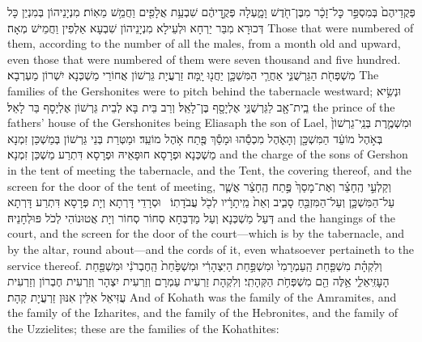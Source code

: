 {פְּקֻדֵיהֶם֙ בְּמִסְפַּ֣ר כׇּל־זָכָ֔ר מִבֶּן־חֹ֖דֶשׁ וָמָ֑עְלָה פְּקֻ֣דֵיהֶ֔ם שִׁבְעַ֥ת אֲלָפִ֖ים וַחֲמֵ֥שׁ מֵאֽוֹת׃}
{מִנְיָנֵיהוֹן בְּמִנְיַן כָּל דְּכוּרָא מִבַּר יַרְחָא וּלְעֵילָא מִנְיָנֵיהוֹן שִׁבְעָא אַלְפִין וַחֲמֵישׁ מְאָה׃}
{Those that were numbered of them, according to the number of all the males, from a month old and upward, even those that were numbered of them were seven thousand and five hundred.}{}
{מִשְׁפְּחֹ֖ת הַגֵּרְשֻׁנִּ֑י אַחֲרֵ֧י הַמִּשְׁכָּ֛ן יַחֲנ֖וּ יָֽמָּה׃}
{זַרְעֲיָת גֵּרְשׁוֹן אֲחוֹרֵי מַשְׁכְּנָא יִשְׁרוֹן מַעְרְבָא׃}
{The families of the Gershonites were to pitch behind the tabernacle westward;}{}
{וּנְשִׂ֥יא בֵֽית־אָ֖ב לַגֵּרְשֻׁנִּ֑י אֶלְיָסָ֖ף בֶּן־לָאֵֽל׃}
{וְרַב בֵּית בָּא לְבֵית גֵּרְשׁוֹן אֶלְיָסָף בַּר לָאֵל׃}
{the prince of the fathers’ house of the Gershonites being Eliasaph the son of Lael,}{}
{וּמִשְׁמֶ֤רֶת בְּנֵֽי־גֵרְשׁוֹן֙ בְּאֹ֣הֶל מוֹעֵ֔ד הַמִּשְׁכָּ֖ן וְהָאֹ֑הֶל מִכְסֵ֕הוּ וּמָסַ֕ךְ פֶּ֖תַח אֹ֥הֶל מוֹעֵֽד׃
}
{וּמַטְּרַת בְּנֵי גֵּרְשׁוֹן בְּמַשְׁכַּן זִמְנָא מַשְׁכְּנָא וּפְרָסָא חוּפָאֵיהּ וּפְרָסָא דִּתְרַע מַשְׁכַּן זִמְנָא׃}
{and the charge of the sons of Gershon in the tent of meeting the tabernacle, and the Tent, the covering thereof, and the screen for the door of the tent of meeting,}{}
{וְקַלְעֵ֣י הֶֽחָצֵ֗ר וְאֶת־מָסַךְ֙ פֶּ֣תַח הֶֽחָצֵ֔ר אֲשֶׁ֧ר עַל־הַמִּשְׁכָּ֛ן וְעַל־הַמִּזְבֵּ֖חַ סָבִ֑יב וְאֵת֙ מֵֽיתָרָ֔יו לְכֹ֖ל עֲבֹדָתֽוֹ׃ \setuma 
{}}
{וּסְרָדֵי דָּרְתָא וְיָת פְּרָסָא דִּתְרַע דָּרְתָא דְּעַל מַשְׁכְּנָא וְעַל מַדְבְּחָא סְחוֹר סְחוֹר וְיָת אֲטוּנוֹהִי לְכֹל פּוּלְחָנֵיהּ׃}
{and the hangings of the court, and the screen for the door of the court—which is by the tabernacle, and by the altar, round about—and the cords of it, even whatsoever pertaineth to the service thereof.}{}
{וְלִקְהָ֗ת מִשְׁפַּ֤חַת הַֽעַמְרָמִי֙ וּמִשְׁפַּ֣חַת הַיִּצְהָרִ֔י וּמִשְׁפַּ֙חַת֙ הַֽחֶבְרֹנִ֔י וּמִשְׁפַּ֖חַת הָעׇזִּֽיאֵלִ֑י אֵ֥לֶּה הֵ֖ם מִשְׁפְּחֹ֥ת הַקְּהָתִֽי׃}
{וְלִקְהָת זַרְעִית עַמְרָם וְזַרְעִית יִצְהָר וְזַרְעִית חֶבְרוֹן וְזַרְעִית עֻזִּיאֵל אִלֵּין אִנּוּן זַרְעֲיָת קְהָת׃}
{And of Kohath was the family of the Amramites, and the family of the Izharites, and the family of the Hebronites, and the family of the Uzzielites; these are the families of the Kohathites:}{}
